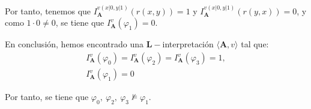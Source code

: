 \documentclass[12pt]{article}
\renewcommand{\bf}[1]{\mathbf{#1}}
\begin{document}
\begin{ejercicio}
\begin{enumerate}
\begin{enumerate}
                Por tanto, tenemos que $I_{\bf{A}}^{v(x|0,y|1)}(r(x, y))=1$ y $I_{\bf{A}}^{v(x|0,y|1)}(r(y, x))=0$, y como $1\cdot 0 \neq 0$, se tiene que $I_{\bf{A}}^v(\varphi_1)=0$.
            \end{enumerate}
    
            En conclusión, hemos encontrado una $\bf{L}-$interpretación $\langle \bf{A},v\rangle$ tal que:
            \begin{gather*}
                I_{\bf{A}}^v(\varphi_0)=I_{\bf{A}}^v(\varphi_2)=I_{\bf{A}}^v(\varphi_3)=1,\\I_{\bf{A}}^v(\varphi_1)=0
            \end{gather*}

            Por tanto, se tiene que $\varphi_0,~\varphi_2,~\varphi_3 \not\models \varphi_1$.
        \end{enumerate}
    \end{ejercicio}


    
\end{document}
